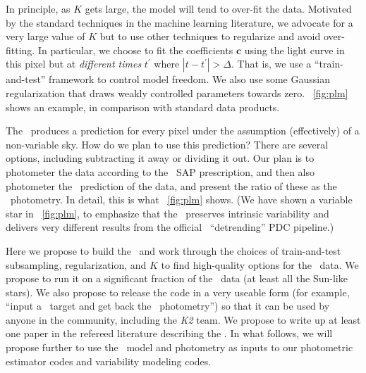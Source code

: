 \documentclass[letterpaper,12pt,preprint]{hack_aastex}
\newcommand{\bvec}[1]{{\ensuremath{{\boldsymbol{#1}}}}}
\begin{document}
In principle, as $K$ gets large, the model will tend to over-fit the data.
Motivated by the standard techniques in the machine learning literature, we
advocate for a very large value of $K$ but to use other techniques to regularize
and avoid over-fitting.
In particular, we choose to fit the coefficients $\bvec{c}$ using the light
curve in this pixel but at \emph{different times} $t^\prime$ where
$|t-t^\prime| > \Delta$.
That is, we use a ``train-and-test'' framework to control model freedom.
We also use some Gaussian regularization that draws weakly controlled parameters
towards zero.
\figurename~\ref{fig:plm} shows an example, in comparison with standard \Kepler
data products.


The \PLM\ produces a prediction for every pixel under the assumption
(effectively) of a non-variable sky.
How do we plan to use this prediction?
There are several options, including subtracting it away or dividing it out.
Our plan is to photometer the data according to the \Kepler\ SAP prescription,
and then also photometer the \PLM\ prediction of the data, and present the
ratio of these as the \PLM\ photometry.
In detail, this is what \figurename~\ref{fig:plm} shows.
(We have shown a variable star in \figurename~\ref{fig:plm}, to emphasize that
the \PLM\ preserves intrinsic variability and delivers very different results
from the official \Kepler\ ``detrending'' PDC pipeline.)

Here we propose to build the \PLM\ and work through the choices of
train-and-test subsampling, regularization, and $K$ to find high-quality
options for the \Kepler\ data.
We propose to run it on a significant fraction of the
\Kepler\ data (at least all the Sun-like stars).
We also propose to release the code in a very useable form (for example, ``input
a \Kepler\ target and get back the \PLM\ photometry'') so that it can be used
by anyone in the community, including the \textsl{K2} team.
We propose to write up at least one paper in the refereed literature describing
the \PLM.
In what follows, we will propose further to use the \PLM\ model and photometry
as inputs to our photometric estimator codes and variability modeling codes.
\end{document}
